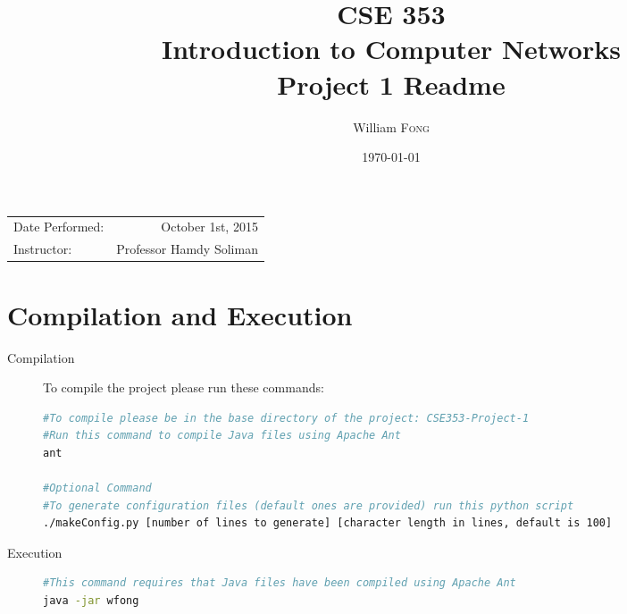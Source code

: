 \documentclass{article}
\title{CSE 353 \\ Introduction to Computer Networks \\ Project 1 Readme} %
\author{William \textsc{Fong}} %
\date{\today} %
\begin{document}
\maketitle %

\begin{center}
\begin{tabular}{l r}
Date Performed: & October 1st, 2015 \\ %
Instructor: & Professor Hamdy Soliman %
\end{tabular}
\end{center}



\section{Compilation and Execution}
\begin{description}
\item[Compilation]
To compile the project please run these commands:
\begin{lstlisting}[language=bash, caption=Order and Description of Command for Compilation]
#To compile please be in the base directory of the project: CSE353-Project-1
#Run this command to compile Java files using Apache Ant
ant

#Optional Command
#To generate configuration files (default ones are provided) run this python script
./makeConfig.py [number of lines to generate] [character length in lines, default is 100]
\end{lstlisting}
\item[Execution]
\begin{lstlisting}[language=bash, caption=To Execute Program]
#This command requires that Java files have been compiled using Apache Ant
java -jar wfong
\end{lstlisting}
\end{description} 
 
\end{document}
